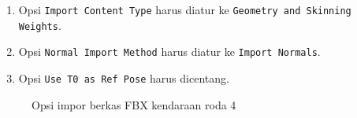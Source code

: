 \begin{enumerate}
    \item Opsi \verb|Import Content Type| harus diatur ke \texttt{Geometry and Skinning Weights}.
    \item Opsi \verb|Normal Import Method| harus diatur ke \verb|Import Normals|.
    \item Opsi \verb|Use T0 as Ref Pose| harus dicentang.
\end{enumerate}

\begin{figure}[!ht]
    \centering
    \hfill
    \caption{Opsi impor berkas FBX kendaraan roda 4}
    \label{fig:fbx-import-options-4wheeled}
\end{figure}

